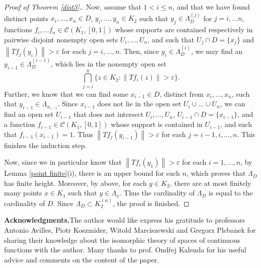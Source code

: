 \documentclass{amsart}
\numberwithin{equation}{section}
\theoremstyle{definition}
\def\C{\mathcal C}
\def\ep{\varepsilon}
\newcommand{\norm}[1]{\left\|#1\right\|}
\begin{document}
\begin{proof}[Proof of Theorem \ref{dist3}.]
Now, assume that $1 <i \leq n$, and that we have found distinct points $x_i, \ldots, x_n \in D$, $y_i, \ldots, y_n \in K_2$ such that $y_j \in \Lambda_D^{(j)}$ for $j=i, \ldots n$, functions $f_i, \ldots f_n \in \C(K_1, [0, 1])$ whose supports are contained respectively in pairwise disjoint nonempty open sets $U_i, \ldots, U_n$, and such that $U_j \cap D=\{x_j\}$ and $\norm{Tf_j(y_i)} > \ep$ for each $j=i, \ldots, n$. Then, since $y_i \in \Lambda_D^{(i)}$, we may find an $y_{i-1} \in \Lambda_D^{(i-1)}$, which lies in the nonempty open set 
\[ \bigcap_{j=i}^n \{z \in K_2:\norm{Tf_i(z)}>\ep\}.\]
Further, we know that we can find some $x_{i-1} \in D$, distinct from $x_i, \ldots, x_n$, such that $y_{i-1} \in \Lambda_{x_{i-1}}$. Since $x_{i-1}$ does not lie in the open set $U_i \cup \ldots \cup U_n$, we can find an open set $U_{i-1}$ that does not intersect $U_i, \ldots, U_n$, $U_{i-1} \cap D=\{x_{i-1}\}$, and a function $f_{i-1} \in \C(K_1, [0, 1])$ whose support is contained in $U_{i-1}$, and such that $f_{i-1}(x_{i-1})=1$. Thus $\norm{Tf_{j}(y_{i-1})}>\ep$ for each $j=i-1, i, \ldots, n$. This finishes the induction step.

Now, since we in particular know that $\norm{Tf_i(y_1)}>\ep$ for each $i=1, \ldots, n$, by Lemma \ref{point finite}(i), there is an upper bound for such $n$, which proves that $\Lambda_D$ has finite height. Moreover, by above, for each $y \in K_2$, there are at most finitely many points $x \in K_1$ such that $y \in \Lambda_x$. Thus the cardinality of $\Lambda_D$ is equal to the cardinality of $D$. Since $\Lambda_D \subset K_2^{(\alpha)}$, the proof is finished. 
\end{proof}

\noindent\textbf{Acknowledgments.}\enspace The author would like express his gratitude to professors Antonio Avilles, Piotr Koszmider, Witold Marciszewski and Gregorz Plebanek for sharing their knowledge about the isomorphic theory of spaces of continuous functions with the author. Many thanks to prof. Ond{\v{r}}ej Kalenda for his useful advice and comments on the content of the paper.




\end{document}
